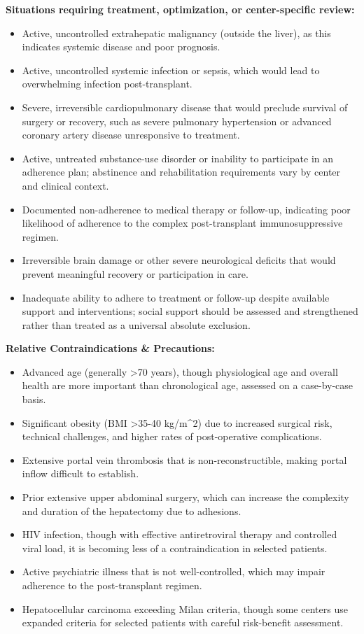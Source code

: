 \textbf{Situations requiring treatment, optimization, or center-specific review:}
\begin{itemize}
  \item Active, uncontrolled extrahepatic malignancy (outside the liver), as this indicates systemic disease and poor prognosis.
  \item Active, uncontrolled systemic infection or sepsis, which would lead to overwhelming infection post-transplant.
  \item Severe, irreversible cardiopulmonary disease that would preclude survival of surgery or recovery, such as severe pulmonary hypertension or advanced coronary artery disease unresponsive to treatment.
  \item Active, untreated substance-use disorder or inability to participate in an adherence plan; abstinence and rehabilitation requirements vary by center and clinical context.
  \item Documented non-adherence to medical therapy or follow-up, indicating poor likelihood of adherence to the complex post-transplant immunosuppressive regimen.
  \item Irreversible brain damage or other severe neurological deficits that would prevent meaningful recovery or participation in care.
  \item Inadequate ability to adhere to treatment or follow-up despite available support and interventions; social support should be assessed and strengthened rather than treated as a universal absolute exclusion.
\end{itemize}

\textbf{Relative Contraindications \& Precautions:}
\begin{itemize}
  \item Advanced age (generally \textgreater 70 years), though physiological age and overall health are more important than chronological age, assessed on a case-by-case basis.
  \item Significant obesity (BMI \textgreater 35-40 kg/m\textasciicircum2) due to increased surgical risk, technical challenges, and higher rates of post-operative complications.
  \item Extensive portal vein thrombosis that is non-reconstructible, making portal inflow difficult to establish.
  \item Prior extensive upper abdominal surgery, which can increase the complexity and duration of the hepatectomy due to adhesions.
  \item HIV infection, though with effective antiretroviral therapy and controlled viral load, it is becoming less of a contraindication in selected patients.
  \item Active psychiatric illness that is not well-controlled, which may impair adherence to the post-transplant regimen.
  \item Hepatocellular carcinoma exceeding Milan criteria, though some centers use expanded criteria for selected patients with careful risk-benefit assessment.
\end{itemize}

